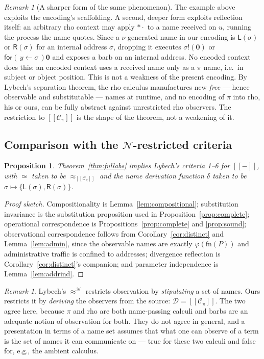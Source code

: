 \documentclass[11pt]{article}
\theoremstyle{definition}
\theoremstyle{plain}
\newtheorem{proposition}[definition]{Proposition}
\theoremstyle{remark}
\newtheorem{remark}[definition]{Remark}
\newcommand{\drp}[1]{{*}#1}
\newcommand{\inp}[3]{\mathsf{for}(\,#1 \leftarrow #2\,)#3}
\newcommand{\out}[2]{#1!(#2)}
\newcommand{\enc}[1]{[\![#1]\!]}
\newcommand{\nil}{\mathbf{0}}
\newcommand{\Lft}{\mathsf{L}}
\newcommand{\Rgt}{\mathsf{R}}
\newcommand{\Ctx}{\mathscr{C}}
\newcommand{\Obs}{\mathcal{D}}
\newcommand{\bisim}{\approx}
\newcommand{\fn}{\mathrm{fn}}
\begin{document}
\begin{remark}[A sharper form of the same phenomenon]
The example above exploits the encoding's scaffolding. A second, deeper
form exploits reflection itself: an arbitrary rho context may apply
$\drp{\cdot}$ to a name received on $u$, running the process the name
quotes. Since a $\nu$-generated name in our encoding is $\Lft(\sigma)$ or
$\Rgt(\sigma)$ for an internal address $\sigma$, dropping it executes
$\out{\sigma}{\nil}$ or $\inp{y}{\sigma}{\nil}$ and exposes a barb on an
internal address. No encoded context does this: an encoded context uses a
received name only as a $\pi$ name, i.e.\ in subject or object position.
This is not a weakness of the present encoding. By Lybech's separation
theorem, the rho calculus manufactures new \emph{free} --- hence
observable and substitutable --- names at runtime, and no encoding of
$\pi$ into rho, his or ours, can be fully abstract against unrestricted
rho observers. The restriction to $\enc{\Ctx_\pi}$ is the shape of the
theorem, not a weakening of it.
\end{remark}

\subsection{Comparison with the $\mathcal{N}$-restricted criteria}

\begin{proposition}\label{prop:criteria}
Theorem~\ref{thm:fullabs} implies Lybech's criteria 1--6 for
$\enc{-}$, with $\simeq$ taken to be $\bisim_{\enc{\Ctx_\pi}}$ and the
name derivation function $\delta$ taken to be
$\sigma \mapsto \{\Lft(\sigma), \Rgt(\sigma)\}$.
\end{proposition}

\begin{proof}[Proof sketch]
Compositionality is Lemma~\ref{lem:compositional}; substitution
invariance is the substitution proposition used in
Proposition~\ref{prop:complete}; operational correspondence is
Propositions~\ref{prop:complete} and \ref{prop:sound}; observational
correspondence follows from Corollary~\ref{cor:distinct} and
Lemma~\ref{lem:admin}, since the observable names are exactly
$\varphi(\fn(P))$ and administrative traffic is confined to addresses;
divergence reflection is Corollary~\ref{cor:distinct}'s companion; and
parameter independence is Lemma~\ref{lem:addrind}.
\end{proof}

\begin{remark}
Lybech's $\bisim^{\mathcal{N}}$ restricts observation by \emph{stipulating}
a set of names. Ours restricts it by \emph{deriving} the observers from
the source: $\Obs = \enc{\Ctx_\pi}$. The two agree here, because $\pi$ and
rho are both name-passing calculi and barbs are an adequate notion of
observation for both. They do not agree in general, and a presentation in
terms of a name set assumes that what one can observe of a term is the
set of names it can communicate on --- true for these two calculi and
false for, e.g., the ambient calculus.
\end{remark}
\end{document}
